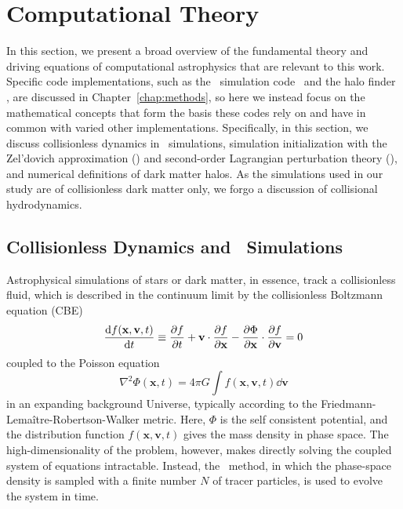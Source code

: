 
%
%

\section{Computational Theory}
\label{sec:computational_theory}



In this section, we present a broad overview of the fundamental theory and driving equations of computational astrophysics that are relevant to this work.  Specific code implementations, such as the \nbody\ simulation code \gadgettwo\ and the halo finder \rockstar, are discussed in Chapter~\ref{chap:methods}, so here we instead focus on the mathematical concepts that form the basis these codes rely on and have in common with varied other implementations.  Specifically, in this section, we discuss collisionless dynamics in \nbody\ simulations, simulation initialization with the Zel'dovich approximation (\za) and second-order Lagrangian perturbation theory (\lpt), and numerical definitions of dark matter halos.  As the simulations used in our study are of collisionless dark matter only, we forgo a discussion of collisional hydrodynamics.




\subsection{Collisionless Dynamics and \nbody\ Simulations}
\label{subsec:computational_theory--nbody_simulations}


Astrophysical simulations of stars or dark matter, in essence, track a collisionless fluid, which is described in the continuum limit by the collisionless Boltzmann equation (CBE)
\begin{equation}
	\frac{{\rm {d}} f(\mathbf{x}, \mathbf{v}, t)}{{\rm {d}} t}
	\equiv \frac{\partial f}{\partial t} + \mathbf{v} \cdot \frac{\partial f}{\partial \mathbf{x}}
	- \frac{\partial \Phi}{\partial \mathbf{x}} \cdot \frac{\partial f}{\partial \mathbf{v}}
	= 0
\end{equation}
coupled to the Poisson equation
\begin{equation}
	\nabla^{2} \Phi(\mathbf{x}, t) = 4 \pi G \int f(\mathbf{x}, \mathbf{v}, t) \dd \mathbf{v}
\end{equation}
in an expanding background Universe, typically according to the Friedmann-Lema\^{i}tre-Robertson-Walker metric.  Here, $\Phi$ is the self consistent potential, and the distribution function $f(\mathbf{x}, \mathbf{v}, t)$ gives the mass density in phase space.  The high-dimensionality of the problem, however, makes directly solving the coupled system of equations intractable.  Instead, the \nbody\ method, in which the phase-space density is sampled with a finite number $N$ of tracer particles, is used to evolve the system in time.  

